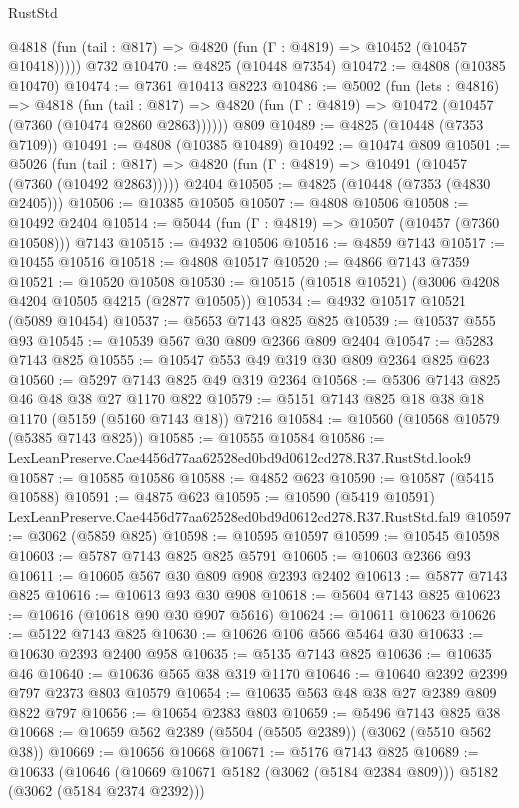 \begin{lexlean}{RustStd}
\begin{coremodule}
      @4818 (fun (tail : @817) => @4820 (fun (Γ : @4819) => @10452 (@10457 @10418)))))
    @732
@10470 := @4825 (@10448 @7354)
@10472 := @4808 (@10385 @10470)
@10474 := @7361 @10413 @8223
@10486 := @5002
    (fun (lets : @4816) =>
    @4818
      (fun (tail : @817) =>
      @4820 (fun (Γ : @4819) => @10472 (@10457 (@7360 (@10474 @2860 @2863))))))
    @809
@10489 := @4825 (@10448 (@7353 @7109))
@10491 := @4808 (@10385 @10489)
@10492 := @10474 @809
@10501 := @5026
    (fun (tail : @817) => @4820 (fun (Γ : @4819) => @10491 (@10457 (@7360 (@10492 @2863)))))
    @2404
@10505 := @4825 (@10448 (@7353 (@4830 @2405)))
@10506 := @10385 @10505
@10507 := @4808 @10506
@10508 := @10492 @2404
@10514 := @5044 (fun (Γ : @4819) => @10507 (@10457 (@7360 @10508))) @7143
@10515 := @4932 @10506
@10516 := @4859 @7143
@10517 := @10455 @10516
@10518 := @4808 @10517
@10520 := @4866 @7143 @7359
@10521 := @10520 @10508
@10530 := @10515 (@10518 @10521) (@3006 @4208 @4204 @10505 @4215 (@2877 @10505))
@10534 := @4932 @10517 @10521 (@5089 @10454)
@10537 := @5653 @7143 @825 @825
@10539 := @10537 @555 @93
@10545 := @10539 @567 @30 @809 @2366 @809 @2404
@10547 := @5283 @7143 @825
@10555 := @10547 @553 @49 @319 @30 @809 @2364 @825 @623
@10560 := @5297 @7143 @825 @49 @319 @2364
@10568 := @5306 @7143 @825 @46 @48 @38 @27 @1170 @822
@10579 := @5151 @7143 @825 @18 @38 @18 @1170 (@5159 (@5160 @7143 @18)) @7216
@10584 := @10560 (@10568 @10579 (@5385 @7143 @825))
@10585 := @10555 @10584
@10586 := LexLeanPreserve.Cae4456d77aa62528ed0bd9d0612cd278.R37.RustStd.look9
@10587 := @10585 @10586
@10588 := @4852 @623
@10590 := @10587 (@5415 @10588)
@10591 := @4875 @623
@10595 := @10590 (@5419 @10591) LexLeanPreserve.Cae4456d77aa62528ed0bd9d0612cd278.R37.RustStd.fal9
@10597 := @3062 (@5859 @825)
@10598 := @10595 @10597
@10599 := @10545 @10598
@10603 := @5787 @7143 @825 @825 @5791
@10605 := @10603 @2366 @93
@10611 := @10605 @567 @30 @809 @908 @2393 @2402
@10613 := @5877 @7143 @825
@10616 := @10613 @93 @30 @908
@10618 := @5604 @7143 @825
@10623 := @10616 (@10618 @90 @30 @907 @5616)
@10624 := @10611 @10623
@10626 := @5122 @7143 @825
@10630 := @10626 @106 @566 @5464 @30
@10633 := @10630 @2393 @2400 @958
@10635 := @5135 @7143 @825
@10636 := @10635 @46
@10640 := @10636 @565 @38 @319 @1170
@10646 := @10640 @2392 @2399 @797 @2373 @803 @10579
@10654 := @10635 @563 @48 @38 @27 @2389 @809 @822 @797
@10656 := @10654 @2383 @803
@10659 := @5496 @7143 @825 @38
@10668 := @10659 @562 @2389 (@5504 (@5505 @2389)) (@3062 (@5510 @562 @38))
@10669 := @10656 @10668
@10671 := @5176 @7143 @825
@10689 := @10633
    (@10646 (@10669 @10671 @5182 (@3062 (@5184 @2384 @809))) @5182 (@3062 (@5184 @2374 @2392)))

\end{coremodule}
\end{lexlean}
